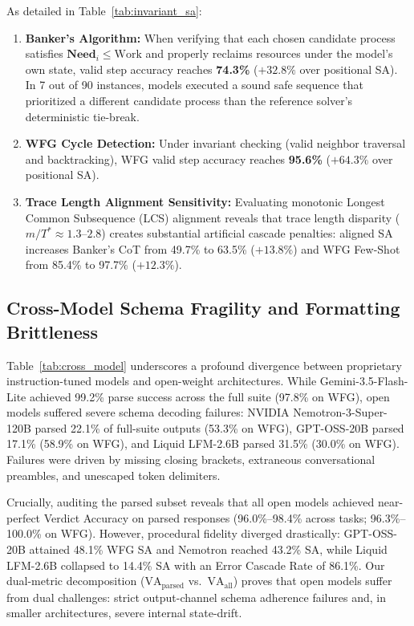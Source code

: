 \documentclass[conference]{IEEEtran}
\newcommand{\VA}{\text{VA}}
\begin{document}
As detailed in Table~\ref{tab:invariant_sa}:
\begin{enumerate}
\item \textbf{Banker's Algorithm:} When verifying that each chosen candidate process
  satisfies $\mathbf{Need}_i \le \text{Work}$ and properly reclaims resources under the
  model's own state, valid step accuracy reaches \textbf{74.3\%} ($+32.8\%$ over
  positional SA). In 7 out of 90 instances, models executed a sound safe sequence that
  prioritized a different candidate process than the reference solver's deterministic
  tie-break.
\item \textbf{WFG Cycle Detection:} Under invariant checking (valid neighbor traversal
  and backtracking), WFG valid step accuracy reaches \textbf{95.6\%} ($+64.3\%$ over
  positional SA).
\item \textbf{Trace Length Alignment Sensitivity:} Evaluating monotonic Longest Common
  Subsequence (LCS) alignment reveals that trace length disparity
  ($m / T^* \approx 1.3$--$2.8$) creates substantial artificial cascade penalties:
  aligned SA increases Banker's CoT from 49.7\% to 63.5\% ($+13.8\%$) and WFG Few-Shot
  from 85.4\% to 97.7\% ($+12.3\%$).
\end{enumerate}

\subsection{Cross-Model Schema Fragility and Formatting Brittleness}

Table~\ref{tab:cross_model} underscores a profound divergence between proprietary
instruction-tuned models and open-weight architectures. While Gemini-3.5-Flash-Lite
achieved 99.2\% parse success across the full suite (97.8\% on WFG), open models
suffered severe schema decoding failures: NVIDIA Nemotron-3-Super-120B parsed 22.1\%
of full-suite outputs (53.3\% on WFG), GPT-OSS-20B parsed 17.1\% (58.9\% on WFG), and
Liquid LFM-2.6B parsed 31.5\% (30.0\% on WFG). Failures were driven by missing closing
brackets, extraneous conversational preambles, and unescaped token delimiters.

Crucially, auditing the parsed subset reveals that all open models achieved near-perfect
Verdict Accuracy on parsed responses (96.0\%--98.4\% across tasks; 96.3\%--100.0\% on WFG).
However, procedural fidelity diverged drastically: GPT-OSS-20B attained 48.1\% WFG SA and
Nemotron reached 43.2\% SA, while Liquid LFM-2.6B collapsed to 14.4\% SA with an Error
Cascade Rate of 86.1\%. Our dual-metric decomposition ($\VA_{\text{parsed}}$ vs.\ $\VA_{\text{all}}$)
proves that open models suffer from dual challenges: strict output-channel schema adherence
failures and, in smaller architectures, severe internal state-drift.
\end{document}

